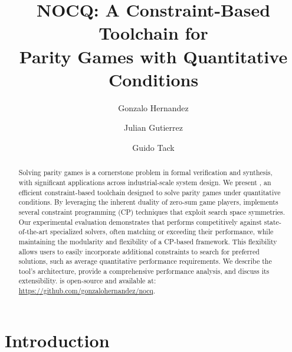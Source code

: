 \documentclass[runningheads]{llncs}
\begin{document}
%
\title{NOCQ: A Constraint-Based Toolchain for\\Parity Games with Quantitative Conditions}

\author{
    Gonzalo Hernandez \and
    Julian Gutierrez \and
    Guido Tack
}
%

%


%
\maketitle              %
%
\begin{abstract}
Solving parity games is a cornerstone problem in formal verification and synthesis, with significant applications across industrial-scale system design. We present \nocq, an efficient constraint-based toolchain designed to solve parity games under quantitative conditions. By leveraging the inherent duality of zero-sum game players, \nocq implements several constraint programming (CP) techniques that exploit search space symmetries. Our experimental evaluation demonstrates that \nocq performs competitively against state-of-the-art specialized solvers, often matching or exceeding their performance, while maintaining the modularity and flexibility of a CP-based framework. This flexibility allows users to easily incorporate additional constraints to search for preferred solutions, such as average quantitative performance requirements. We describe the tool's architecture, provide a comprehensive performance analysis, and discuss its extensibility. \nocq is open-source and available at: \url{https://github.com/gonzalohernandez/nocq}.

\end{abstract}
%
\section{Introduction}
\end{document}
